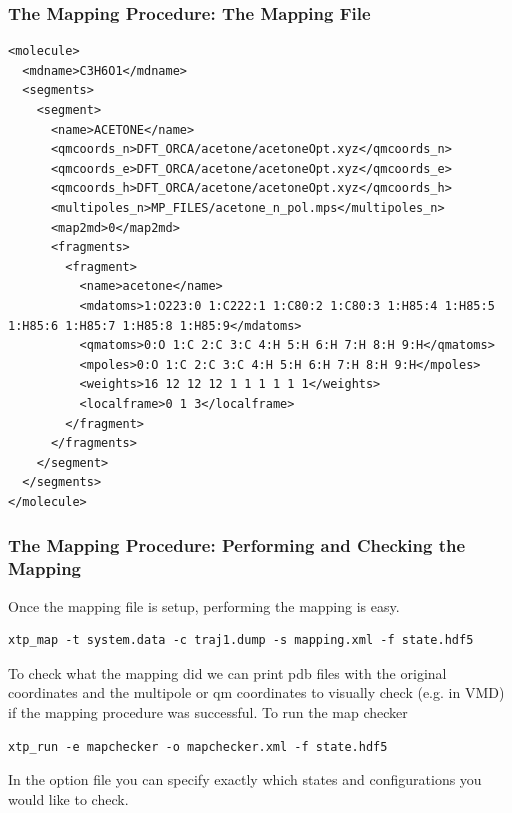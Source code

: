 \documentclass[t,aspectratio=169, 8pt]{beamer}
\begin{document}
\begin{frame}[fragile]
  \frametitle{The Mapping Procedure: The Mapping File}

  \begin{verbatim}
<molecule>
  <mdname>C3H6O1</mdname>
  <segments>
    <segment>
      <name>ACETONE</name>
      <qmcoords_n>DFT_ORCA/acetone/acetoneOpt.xyz</qmcoords_n>
      <qmcoords_e>DFT_ORCA/acetone/acetoneOpt.xyz</qmcoords_e>
      <qmcoords_h>DFT_ORCA/acetone/acetoneOpt.xyz</qmcoords_h>
      <multipoles_n>MP_FILES/acetone_n_pol.mps</multipoles_n>
      <map2md>0</map2md>
      <fragments>
        <fragment>
          <name>acetone</name>
          <mdatoms>1:O223:0 1:C222:1 1:C80:2 1:C80:3 1:H85:4 1:H85:5 1:H85:6 1:H85:7 1:H85:8 1:H85:9</mdatoms>
          <qmatoms>0:O 1:C 2:C 3:C 4:H 5:H 6:H 7:H 8:H 9:H</qmatoms>
          <mpoles>0:O 1:C 2:C 3:C 4:H 5:H 6:H 7:H 8:H 9:H</mpoles>
          <weights>16 12 12 12 1 1 1 1 1 1</weights>
          <localframe>0 1 3</localframe>
        </fragment>
      </fragments>
    </segment>
  </segments>
</molecule>
  \end{verbatim}
\end{frame}

\begin{frame}[fragile]
  \frametitle{The Mapping Procedure: Performing and Checking the Mapping}
  Once the mapping file is setup, performing the mapping is easy.

  \begin{verbatim}
xtp_map -t system.data -c traj1.dump -s mapping.xml -f state.hdf5
  \end{verbatim}

  To check what the mapping did we can print pdb files with the original coordinates and the multipole or qm coordinates to visually check (e.g. in VMD) if the mapping procedure was successful. To run the map checker
  \begin{verbatim}
xtp_run -e mapchecker -o mapchecker.xml -f state.hdf5
  \end{verbatim}
  In the option file you can specify exactly which states and configurations you would like to check.
\end{frame}
\end{document}
